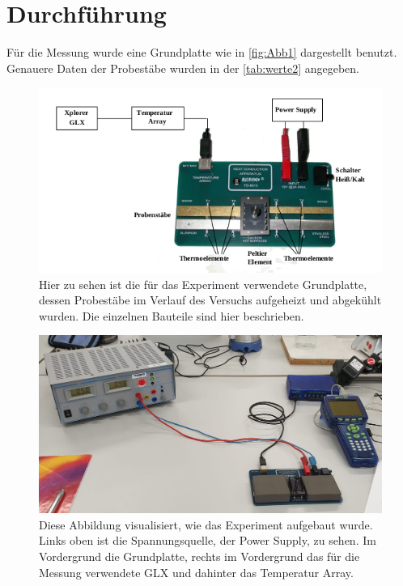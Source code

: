 \section{Durchführung}
\label{sec:Durchführung}

Für die Messung wurde eine Grundplatte wie in \autoref{fig:Abb1} dargestellt benutzt. Genauere Daten der Probestäbe wurden in der \autoref{tab:werte2} angegeben.

\begin{figure}
    \centering
    \includegraphics[scale=0.7]{content/Bilder/Aufbau.png}
    \caption{Hier zu sehen ist die für das Experiment verwendete Grundplatte, dessen Probestäbe im Verlauf des Versuchs aufgeheizt und abgekühlt wurden. Die einzelnen Bauteile sind hier beschrieben.}
    \label{fig:Abb1}
\end{figure}

\begin{figure}
    \centering
    \includegraphics[scale=0.2]{content/Bilder/Aufbau2.png}
    \caption{Diese Abbildung visualisiert, wie das Experiment aufgebaut wurde. Links oben ist die Spannungsquelle, der Power Supply, zu sehen. Im Vordergrund die Grundplatte, rechts im Vordergrund das für die Messung verwendete GLX und dahinter das Temperatur Array.}
    \label{fig:Abb2}
\end{figure}

